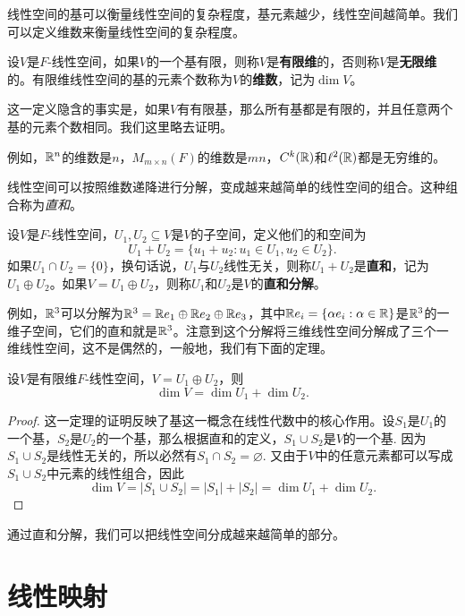 线性空间的基可以衡量线性空间的复杂程度，基元素越少，线性空间越简单。我们可以定义维数来衡量线性空间的复杂程度。

\begin{definition}[维数]
设$V$是$F$-线性空间，如果$V$的一个基有限，则称$V$是\textbf{有限维}的，否则称$V$是\textbf{无限维}的。有限维线性空间的基的元素个数称为$V$的\textbf{维数}，记为$\dim V$。
\end{definition}
这一定义隐含的事实是，如果$V$有有限基，那么所有基都是有限的，并且任意两个基的元素个数相同。我们这里略去证明。

例如，$\mathbb{R}^n$的维数是$n$，$M_{m\times n}(F)$的维数是$mn$，$C^k(\mathbb{R})$和$\ell^2(\mathbb{R})$都是无穷维的。

线性空间可以按照维数递降进行分解，变成越来越简单的线性空间的组合。这种组合称为\emph{直和}。

\begin{definition}[和空间与直和]
设$V$是$F$-线性空间，$U_1,U_2\subseteq V$是$V$的子空间，定义他们的和空间为
\[
    U_1+U_2=\{u_1+u_2:u_1\in U_1,u_2\in U_2\}.
\]
如果$U_1\cap U_2=\{0\}$，换句话说，$U_1$与$U_2$线性无关，则称$U_1+U_2$是\textbf{直和}，记为$U_1\oplus U_2$。如果$V=U_1\oplus U_2$，则称$U_1$和$U_2$是$V$的\textbf{直和分解}。
\end{definition}

例如，$\mathbb{R}^3$可以分解为$\mathbb{R}^3=\mathbb{R} e_1\oplus \mathbb{R} e_2\oplus \mathbb{R} e_3$，其中$\mathbb{R} e_i=\{\alpha e_i:\alpha\in\mathbb{R}\}$是$\mathbb{R}^3$的一维子空间，它们的直和就是$\mathbb{R}^3$。注意到这个分解将三维线性空间分解成了三个一维线性空间，这不是偶然的，一般地，我们有下面的定理。

\begin{theorem}[维数定理]\label{thm:dim-thm}
设$V$是有限维$F$-线性空间，$V=U_1\oplus U_2$，则
\[
    \dim V=\dim U_1+\dim U_2.
\]
\end{theorem}
\begin{proof}
    这一定理的证明反映了基这一概念在线性代数中的核心作用。设$S_1$是$U_1$的一个基，$S_2$是$U_2$的一个基，那么根据直和的定义，$S_1\cup S_2$是$V$的一个基. 因为$S_1\cup S_2$是线性无关的，所以必然有$S_1\cap S_2=\varnothing$. 又由于$V$中的任意元素都可以写成$S_1\cup S_2$中元素的线性组合，因此
    \[
        \dim V=|S_1\cup S_2|=|S_1|+|S_2|=\dim U_1+\dim U_2.
    \]
\end{proof}
通过直和分解，我们可以把线性空间分成越来越简单的部分。

\section{线性映射}

